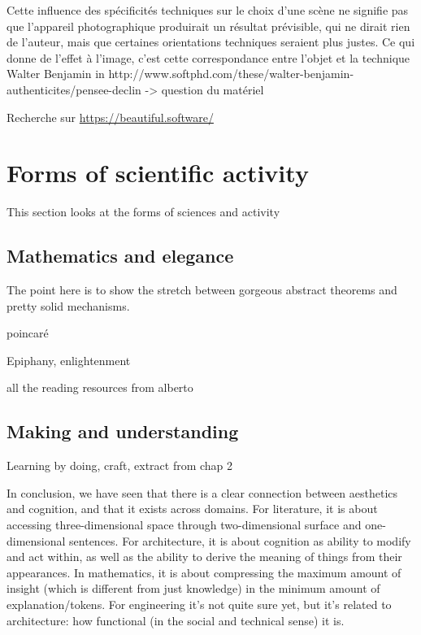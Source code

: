 Cette influence des spécificités techniques sur le choix d'une scène ne signifie pas que l'appareil photographique produirait un résultat prévisible, qui ne dirait rien de l'auteur, mais que certaines orientations techniques seraient plus justes. Ce qui donne de l'effet à l'image, c'est cette correspondance entre l'objet et la technique Walter Benjamin in http://www.softphd.com/these/walter-benjamin-authenticites/pensee-declin -> question du matériel

Recherche sur \url{https://beautiful.software/}


\section{Forms of scientific activity}
\label{sec:aesthetic-scientific}

This section looks at the forms of sciences and activity


\subsection{Mathematics and elegance}
\label{subsec:aesthetic-mathematics}

The point here is to show the stretch between gorgeous abstract theorems and pretty solid mechanisms.

poincaré

Epiphany, enlightenment

all the reading resources from alberto


\subsection{Making and understanding}
\label{subsec:aesthetic-engineering}


Learning by doing, craft, extract from chap 2

\spacer

In conclusion, we have seen that there is a clear connection between aesthetics and cognition, and that it exists across domains. For literature, it is about accessing three-dimensional space through two-dimensional surface and one-dimensional sentences. For architecture, it is about cognition as ability to modify and act within, as well as the ability to derive the meaning of things from their appearances. In mathematics, it is about compressing the maximum amount of insight (which is different from just knowledge) in the minimum amount of explanation/tokens. For engineering it's not quite sure yet, but it's related to architecture: how functional (in the social and technical sense) it is.
